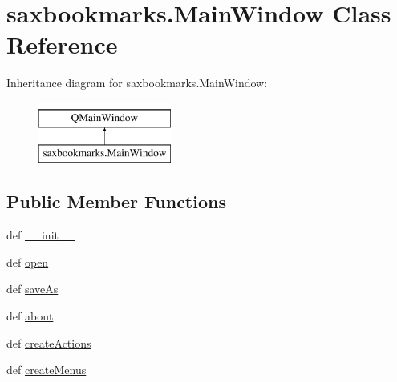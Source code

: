\hypertarget{classsaxbookmarks_1_1MainWindow}{}\section{saxbookmarks.\+Main\+Window Class Reference}
\label{classsaxbookmarks_1_1MainWindow}
Inheritance diagram for saxbookmarks.\+Main\+Window\+:\begin{figure}[H]
\begin{center}
\leavevmode
\includegraphics[height=2.000000cm]{classsaxbookmarks_1_1MainWindow}
\end{center}
\end{figure}
\subsection*{Public Member Functions}
\begin{DoxyCompactItemize}
\item 
def \hyperlink{classsaxbookmarks_1_1MainWindow_adc949eee003e6210575b52f64bf9c1fc}{\+\_\+\+\_\+init\+\_\+\+\_\+}
\item 
def \hyperlink{classsaxbookmarks_1_1MainWindow_af06bb7bf2d0f3a7e7187c744ca7840fc}{open}
\item 
def \hyperlink{classsaxbookmarks_1_1MainWindow_a0887db2ad595c741c735567d6e853bb5}{save\+As}
\item 
def \hyperlink{classsaxbookmarks_1_1MainWindow_aa9bd6228d73df54128827874f187554e}{about}
\item 
def \hyperlink{classsaxbookmarks_1_1MainWindow_aa11537946b63763c204824d92732370b}{create\+Actions}
\item 
def \hyperlink{classsaxbookmarks_1_1MainWindow_ad90ef1f80e93878eb06b1e8bf89b356e}{create\+Menus}
\end{DoxyCompactItemize}
